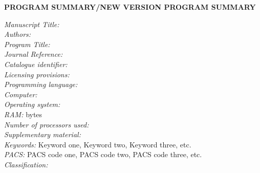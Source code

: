 \documentclass{elsart}
\newcounter{bla}
\begin{document}

{\bf PROGRAM SUMMARY/NEW VERSION PROGRAM SUMMARY}

\begin{small}
\noindent
{\em Manuscript Title:}                                       \\
{\em Authors:}                                                \\
{\em Program Title:}                                          \\
{\em Journal Reference:}                                      \\
{\em Catalogue identifier:}                                   \\
{\em Licensing provisions:}                                   \\
{\em Programming language:}                                   \\
{\em Computer:}                                               \\
{\em Operating system:}                                       \\
{\em RAM:} bytes                                              \\
{\em Number of processors used:}                              \\
{\em Supplementary material:}                                 \\
{\em Keywords:} Keyword one, Keyword two, Keyword three, etc.  \\
{\em PACS:} PACS code one, PACS code two, PACS code three, etc.                                                  \\
{\em Classification:}                                         \\

\end{small}
\end{document}
